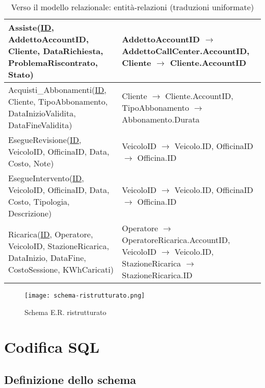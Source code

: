 \documentclass{article}
\begin{document}
\begin{table}[H]
\begin{tabularx}{\textwidth}{|X|X|}
        Assiste(\underline{ID}, AddettoAccountID, Cliente, DataRichiesta, ProblemaRiscontrato, Stato) & AddettoAccountID \(\to\) AddettoCallCenter.AccountID, Cliente \(\to\) Cliente.AccountID \\ \hline
        Acquisti\_Abbonamenti(\underline{ID}, Cliente, TipoAbbonamento, DataInizioValidita, DataFineValidita) & Cliente \(\to\) Cliente.AccountID, TipoAbbonamento \(\to\) Abbonamento.Durata \\ \hline
        EsegueRevisione(\underline{ID}, VeicoloID, OfficinaID, Data, Costo, Note) & VeicoloID \(\to\) Veicolo.ID, OfficinaID \(\to\) Officina.ID \\ \hline
        EsegueIntervento(\underline{ID}, VeicoloID, OfficinaID, Data, Costo, Tipologia, Descrizione) & VeicoloID \(\to\) Veicolo.ID, OfficinaID \(\to\) Officina.ID \\ \hline
        Ricarica(\underline{ID}, Operatore, VeicoloID, StazioneRicarica, DataInizio, DataFine, CostoSessione, KWhCaricati) & Operatore \(\to\) OperatoreRicarica.AccountID, VeicoloID \(\to\) Veicolo.ID, StazioneRicarica \(\to\) StazioneRicarica.ID \\ \hline
    \end{tabularx}
    \caption{Verso il modello relazionale: entità-relazioni (traduzioni uniformate)}
    \label{tab:entita-relazioni-tradotte}
\end{table}




\begin{figure}
    \centering
    \texttt{[image: schema-ristrutturato.png]}
    \caption{Schema E.R. ristrutturato}
    \label{fig:schema-ristrutturato}
\end{figure}

\restoregeometry


\section{Codifica SQL}

\subsection{Definizione dello schema}
\end{document}
